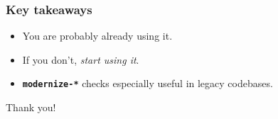 \documentclass[aspectratio=169]{beamer}
\newcommand{\cpp}[1]{\texttt{\textbf{\textcolor{clCodeBlue}{#1}}}}
\begin{document}
\begin{frame}
\frametitle{Key takeaways}
{\centering
\begin{itemize}
  \item{} You are probably already using it.
  \item{} If you don't, \textit{start using it}.
  \item{} \cpp{modernize-*} checks especially useful in legacy codebases.
\end{itemize}

\vspace{2ex}
\begin{center}{\Large Thank you!}\end{center}
}
\end{frame}

\end{document}

